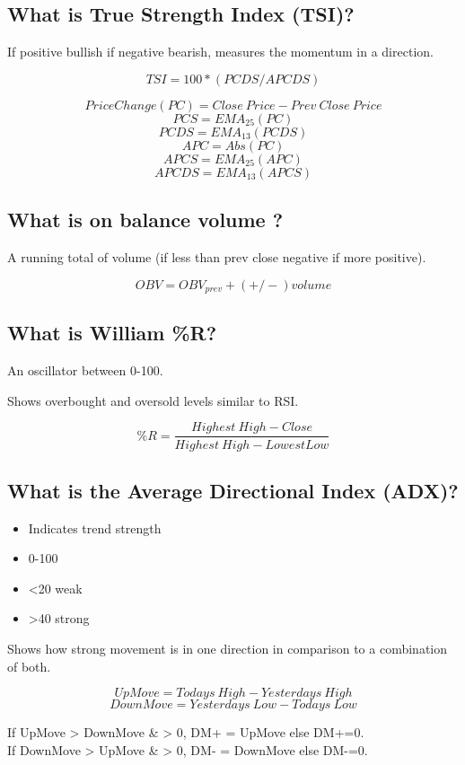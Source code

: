 \documentclass[11pt]{scrartcl} %
\begin{document}
\subsection{What is True Strength Index (TSI)?}

If positive bullish if negative bearish, measures the momentum in a direction.

\[ TSI = 100*(PCDS/APCDS) \]

\[ PriceChange(PC) = Close\:Price -Prev\:Close\:Price \]
\[PCS = EMA_{25}(PC) \]
\[PCDS = EMA_{13}(PCDS) \]
\[ APC = Abs(PC) \]
\[ APCS = EMA_{25}(APC) \]
\[ APCDS = EMA_{13}(APCS) \]

\subsection{What is on balance volume ?}

A running total of volume (if less than prev close negative if more positive).

\[ OBV = OBV_{prev} + (+/-)volume\]

\subsection{What is William \%R?}

An oscillator between 0-100.

Shows overbought and oversold levels similar to RSI.

\[ \%R = \frac{Highest\:High - Close}{Highest\:High - Lowest Low} \]

\subsection{What is the Average Directional Index (ADX)?}

\begin{itemize}
	\item Indicates trend strength
	\item 0-100
	\item <20 weak
	\item >40 strong 
\end{itemize}

Shows how strong movement is in one direction in comparison to a combination of both.

\[ UpMove = Todays\:High - Yesterdays\:High \]
\[ DownMove = Yesterdays\:Low - Todays\:Low \]

If UpMove > DownMove \& > 0, DM+ = UpMove else DM+=0.\\
If DownMove > UpMove \& > 0, DM- = DownMove else DM-=0.
\end{document}
